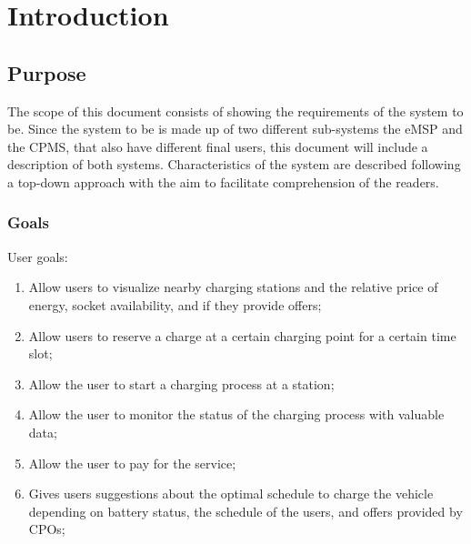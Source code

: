 \documentclass{Configuration_Files/PoliMi3i_thesis}
\begin{document}
\mainmatter %

\chapter{Introduction}

\section{Purpose}

The scope of this document consists of showing the requirements of the system to be. Since the system to be is made up of two different sub-systems the eMSP and the CPMS, that also have different final users, this document will include a description of both systems.
Characteristics of the system are described following a top-down approach with the aim to facilitate comprehension of the readers.

\subsection{Goals}
User goals:
\begin{enumerate}[label=\textbf{G\arabic*}]

    \item Allow users to visualize nearby charging stations and the relative price of energy, socket availability, and if they provide offers;
    
    \item Allow users to reserve a charge at a certain charging point for a certain time slot;
    
    \item Allow the user to start a charging process at a station;

    \item Allow the user to monitor the status of the charging process with valuable data;

    \item Allow the user to pay for the service;

    \item Gives users suggestions about the optimal schedule to charge the vehicle depending on battery status, the schedule of the users, and offers provided by CPOs;

\end{enumerate}
\end{document}
